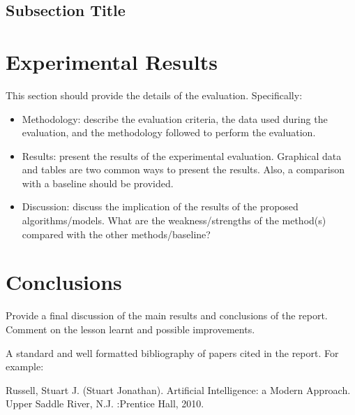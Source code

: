 \documentclass{svproc}
\begin{document}
\subsection{Subsection Title}

\section{Experimental Results}
This section should provide the details of the evaluation. Specifically:
\begin{itemize}
\item Methodology: describe the evaluation criteria, the data used during the evaluation, and the methodology followed to perform the evaluation. 
\item Results: present the results of the experimental evaluation. Graphical data and tables are two common ways to present the results. Also, a comparison with a baseline should be provided.
\item Discussion: discuss the implication of the results of the proposed algorithms/models. What are the weakness/strengths of the method(s) compared with the other methods/baseline?
\end{itemize}

\section{Conclusions}
Provide a final discussion of the main results and conclusions of the report. Comment on the lesson learnt and possible improvements.


A standard and well formatted bibliography of papers cited in the report. For example:

\begin{thebibliography}{6}
%

Russell, Stuart J. (Stuart Jonathan). Artificial Intelligence: a Modern Approach. Upper Saddle River, N.J.       :Prentice Hall, 2010.


\end{thebibliography}
\end{document}
